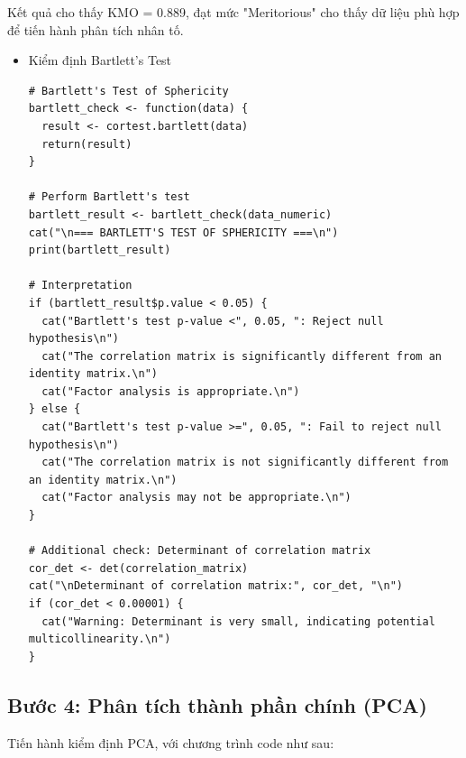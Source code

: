 Kết quả cho thấy KMO = 0.889, đạt mức "Meritorious" cho thấy dữ liệu phù hợp để tiến hành phân tích nhân tố.

\begin{itemize}
\item Kiểm định Bartlett's Test
\begin{lstlisting}[caption={Code kiểm định Bartlett's Test}]
# Bartlett's Test of Sphericity
bartlett_check <- function(data) {
  result <- cortest.bartlett(data)
  return(result)
}

# Perform Bartlett's test
bartlett_result <- bartlett_check(data_numeric)
cat("\n=== BARTLETT'S TEST OF SPHERICITY ===\n")
print(bartlett_result)

# Interpretation
if (bartlett_result$p.value < 0.05) {
  cat("Bartlett's test p-value <", 0.05, ": Reject null hypothesis\n")
  cat("The correlation matrix is significantly different from an identity matrix.\n")
  cat("Factor analysis is appropriate.\n")
} else {
  cat("Bartlett's test p-value >=", 0.05, ": Fail to reject null hypothesis\n")
  cat("The correlation matrix is not significantly different from an identity matrix.\n")
  cat("Factor analysis may not be appropriate.\n")
}

# Additional check: Determinant of correlation matrix
cor_det <- det(correlation_matrix)
cat("\nDeterminant of correlation matrix:", cor_det, "\n")
if (cor_det < 0.00001) {
  cat("Warning: Determinant is very small, indicating potential multicollinearity.\n")
}
\end{lstlisting}
\end{itemize}

\subsection{Bước 4: Phân tích thành phần chính (PCA)}

Tiến hành kiểm định PCA, với chương trình code như sau:

